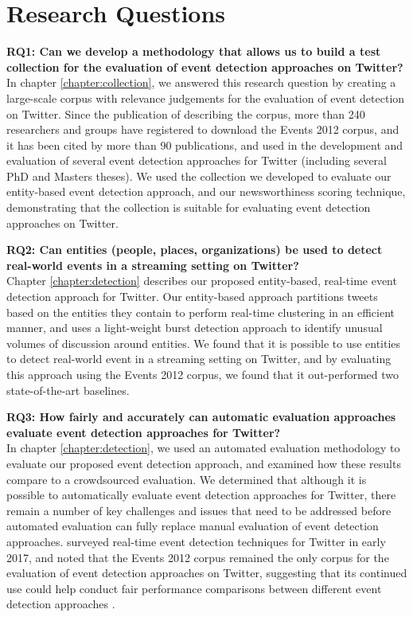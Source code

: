 \section{Research Questions}
\textbf{RQ1: Can we develop a methodology that allows us to build a test collection for the evaluation of event detection approaches on Twitter?}\\
In chapter \ref{chapter:collection}, we answered this research question by creating a large-scale corpus with relevance judgements for the evaluation of event detection on Twitter.
Since the publication of \cite{McMinn2013} describing the corpus, more than 240 researchers and groups have registered to download the Events 2012 corpus, and it has been cited by more than 90 publications, and used in the development and evaluation of several event detection approaches for Twitter (including several PhD and Masters theses).
We used the collection we developed to evaluate our entity-based event detection approach, and our newsworthiness scoring technique, demonstrating that the collection is suitable for evaluating event detection approaches on Twitter.

\textbf{RQ2: Can entities (people, places, organizations) be used to detect real-world events in a streaming setting on Twitter?} \\
Chapter \ref{chapter:detection} describes our proposed entity-based, real-time event detection approach for Twitter.
Our entity-based approach partitions tweets based on the entities they contain to perform real-time clustering in an efficient manner, and uses a light-weight burst detection approach to identify unusual volumes of discussion around entities.
We found that it is possible to use entities to detect real-world event in a streaming setting on Twitter, and by evaluating this approach using the Events 2012 corpus, we found that it out-performed two state-of-the-art baselines.

\textbf{RQ3: How fairly and accurately can automatic evaluation approaches evaluate event detection approaches for Twitter?} \\
In chapter \ref{chapter:detection}, we used an automated evaluation methodology to evaluate our proposed event detection approach, and examined how these results compare to a crowdsourced evaluation.
We determined that although it is possible to automatically evaluate event detection approaches for Twitter, there remain a number of key challenges and issues that need to be addressed before automated evaluation can fully replace manual evaluation of event detection approaches.
\cite{Hasan17} surveyed real-time event detection techniques for Twitter in early 2017, and noted that the Events 2012 corpus remained the only corpus for the evaluation of event detection approaches on Twitter, suggesting that its continued use could help conduct fair performance comparisons between different event detection approaches \citep{Hasan17}.

